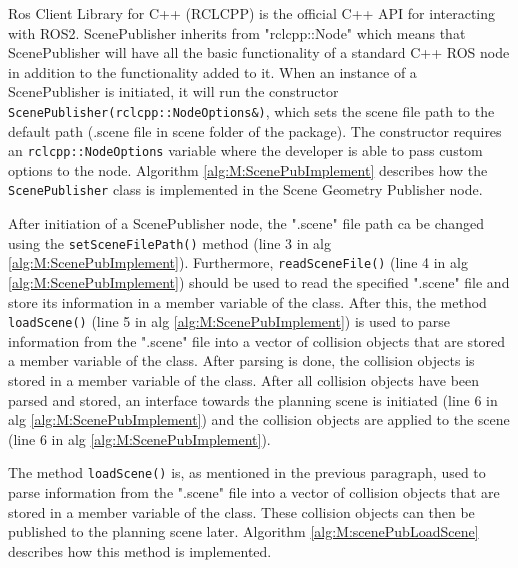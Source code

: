 Ros Client Library for C++ (RCLCPP) is the official C++ API for interacting with ROS2. ScenePublisher inherits from "rclcpp::Node" which means that ScenePublisher will have all the basic functionality of a standard C++ ROS node in addition to the functionality added to it. When an instance of a ScenePublisher is initiated, it will run the constructor \lstinline{ScenePublisher(rclcpp::NodeOptions&)}, which sets the scene file path to the default path (.scene file in scene folder of the package). The constructor requires an \lstinline{rclcpp::NodeOptions} variable where the developer is able to pass custom options to the node. Algorithm \ref{alg:M:ScenePubImplement} describes how the \lstinline{ScenePublisher} class is implemented in the Scene Geometry Publisher node.



After initiation of a ScenePublisher node, the ".scene" file path ca be changed using the \lstinline{setSceneFilePath()} method (line 3 in alg \ref{alg:M:ScenePubImplement}). Furthermore, \lstinline{readSceneFile()} (line 4 in alg \ref{alg:M:ScenePubImplement}) should be used to read the specified ".scene" file and store its information in a member variable of the class. After this, the method \lstinline{loadScene()} (line 5 in alg \ref{alg:M:ScenePubImplement}) is used to parse information from the ".scene" file into a vector of collision objects that are stored a member variable of the class. After parsing is done, the collision objects is stored in a member variable of the class. After all collision objects have been parsed and stored, an interface towards the planning scene is initiated (line 6 in alg \ref{alg:M:ScenePubImplement}) and the collision objects are applied to the scene (line 6 in alg \ref{alg:M:ScenePubImplement}).

The method \lstinline{loadScene()} is, as mentioned in the previous paragraph, used to parse information from the ".scene" file into a vector of collision objects that are stored in a member variable of the class. These collision objects can then be published to the planning scene later. Algorithm \ref{alg:M:scenePubLoadScene} describes how this method is implemented.



